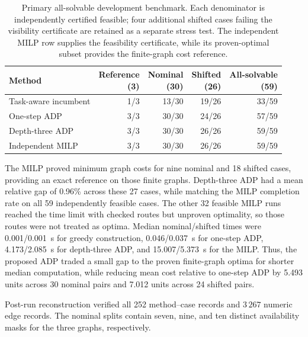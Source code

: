 \documentclass{IEEEtaes}
\begin{document}
\begin{table}[t]
  \centering
  \caption{Primary all-solvable development benchmark. Each denominator is independently certified feasible; four additional shifted cases failing the visibility certificate are retained as a separate stress test. The independent MILP row supplies the feasibility certificate, while its proven-optimal subset provides the finite-graph cost reference.}
  \label{tab:redundant-view-pilot}
  \renewcommand{\arraystretch}{1.08}
  \setlength{\tabcolsep}{3pt}
  \footnotesize
  \begin{tabular*}{\linewidth}{@{\extracolsep{\fill}}lrrrr@{}}
    \toprule
    Method & \shortstack[r]{Reference\\(3)} & \shortstack[r]{Nominal\\(30)} & \shortstack[r]{Shifted\\(26)} & \shortstack[r]{All-solvable\\(59)} \\
    \midrule
    Task-aware incumbent & 1/3 & 13/30 & 19/26 & 33/59 \\
    One-step ADP & 3/3 & 30/30 & 24/26 & 57/59 \\
    Depth-three ADP & 3/3 & 30/30 & 26/26 & 59/59 \\
    Independent MILP & 3/3 & 30/30 & 26/26 & 59/59 \\
    \bottomrule
  \end{tabular*}
\end{table}

The MILP proved minimum graph costs for nine nominal and 18 shifted cases, providing an exact reference on those finite graphs. Depth-three ADP had a mean relative gap of 0.96\% across these 27 cases, while matching the MILP completion rate on all 59 independently feasible cases. The other 32 feasible MILP runs reached the time limit with checked routes but unproven optimality, so those routes were not treated as optima. Median nominal/shifted times were 0.001/0.001~s for greedy construction, 0.046/0.037~s for one-step ADP, 4.173/2.085~s for depth-three ADP, and 15.007/5.373~s for the MILP. Thus, the proposed ADP traded a small gap to the proven finite-graph optima for shorter median computation, while reducing mean cost relative to one-step ADP by 5.493 units across 30 nominal pairs and 7.012 units across 24 shifted pairs.

Post-run reconstruction verified all 252 method--case records and $3\,267$ numeric edge records. The nominal splits contain seven, nine, and ten distinct availability masks for the three graphs, respectively.
\end{document}
